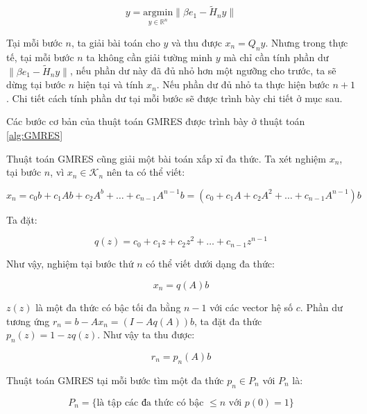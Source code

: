 \documentclass[14pt, a4paper]{article}
\numberwithin{equation}{section}
\numberwithin{algorithm}{section}
\numberwithin{figure}{section}
\numberwithin{dl}{section}
\numberwithin{md}{section}
\numberwithin{bd}{section}
\numberwithin{dn}{section}
\begin{document}
\begin{equation}
    y = \underset{y \in \mathbb{R}^{n}}{\mathrm{argmin}} \lVert \beta e_1 - \widetilde{H}_n y \rVert
\end{equation}

Tại mỗi bước $n$, ta giải bài toán cho $y$ và thu được $x_n = Q_n y$. Nhưng trong thực tế, tại mỗi bước $n$ ta không cần giải tường minh $y$ mà chỉ cần tính phần dư $\lVert \beta e_1 - \widetilde{H}_n y \rVert$, nếu phần dư này đã đủ nhỏ hơn một ngưỡng cho trước, ta sẽ dừng tại bước $n$ hiện tại và tính $x_n$. Nếu phần dư đủ nhỏ ta thực hiện bước $n+1$. Chi tiết cách tính phần dư tại mỗi bước sẽ được trình bày chi tiết ở mục sau.

Các bước cơ bản của thuật toán GMRES được trình bày ở thuật toán \ref{alg:GMRES}

Thuật toán GMRES cũng giải một bài toán xấp xỉ đa thức. Ta xét nghiệm $x_n$, tại bước $n$, vì $x_n \in \mathcal{K}_n$ nên ta có thể viết:

\begin{equation}
    x_n = c_0 b + c_1 A b + c_2 A^b + \dots + c_{n-1}A^{n-1}b=(c_0 + c_1 A + c_2 A^2 + \dots + c_{n-1} A^{n-1})b
\end{equation}

Ta đặt:

\begin{equation}
    q(z) = c_0 + c_1 z + c_2 z^2 + \dots + c_{n-1}z^{n-1}
\end{equation}

Như vậy, nghiệm tại bước thứ $n$ có thể viết dưới dạng đa thức:

\begin{equation}
    x_n = q(A)b
\end{equation}

$z(z)$ là một đa thức có bậc tối đa bằng $n-1$ với các vector hệ số $c$. Phần dư tương ứng $r_n=b - Ax_n=(I - Aq(A))b$, ta đặt đa thức $p_n(z) = 1 - z q(z)$. Như vậy ta thu được:

\begin{equation} \label{eq:Polynomial-Approximation}
    r_n = p_n(A)b
\end{equation}

Thuật toán GMRES tại mỗi bước tìm một đa thức $p_n \in P_n$ với $P_n$ là:

\begin{equation}
    P_n = \lbrace \text{là tập các đa thức có bậc } \leq n \text{ với } p(0)=1 \rbrace
\end{equation}
\end{document}
